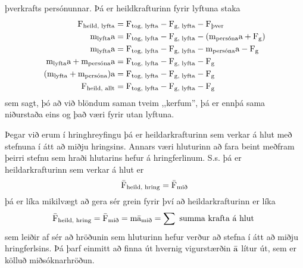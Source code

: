 þverkrafts persónunnar. Þá er heildkrafturinn fyrir lyftuna staka
\begin{align*}
	\textrm{F}_\text{heild, lyfta}
		&= \textrm{F}_\text{tog, lyfta} - \textrm{F}_\text{g, lyfta} - \textrm{F}_\text{þver} \\
	\textrm{m}_\text{lyfta} \textrm{a}
		&= \textrm{F}_\text{tog, lyfta} - \textrm{F}_\text{g, lyfta} - (\textrm{m}_\text{persóna} \textrm{a} + \textrm{F}_\text{g} ) \\
	\textrm{m}_\text{lyfta} \textrm{a}
		&= \textrm{F}_\text{tog, lyfta} - \textrm{F}_\text{g, lyfta} - \textrm{m}_\text{persóna} \textrm{a} - \textrm{F}_\text{g} \\
	\textrm{m}_\text{lyfta} \textrm{a} + \textrm{m}_\text{persóna} \textrm{a}
		&= \textrm{F}_\text{tog, lyfta} - \textrm{F}_\text{g, lyfta}  - \textrm{F}_\text{g} \\
	(\textrm{m}_\text{lyfta} + \textrm{m}_\text{persóna}) \textrm{a}
		&= \textrm{F}_\text{tog, lyfta} - \textrm{F}_\text{g, lyfta}  - \textrm{F}_\text{g} \\
	\textrm{F}_\text{heild, allt}
		&= \textrm{F}_\text{tog, lyfta} - \textrm{F}_\text{g, lyfta}  - \textrm{F}_\text{g} \\
\end{align*}
sem sagt, þó að við blöndum saman tveim ,,kerfum'', þá er ennþá sama niðurstaða
eins og það væri fyrir utan lyftuna. 

Þegar við erum í hringhreyfingu þá er heildarkrafturinn sem verkar á hlut með
stefnuna í átt að miðju hringsins. Annars væri hluturinn að fara beint meðfram
þeirri stefnu sem hraði hlutarins hefur á hringferlinum. S.s. þá er heildarkrafturinn
sem verkar á hlut er
\begin{equation}
	\bar{\textrm{F}}_\text{heild, hring} = \bar{\textrm{F}}_\text{mið}
\end{equation}
þá er líka mikilvægt að gera sér grein fyrir því að heildarkrafturinn
er líka
\[
	\bar{\textrm{F}}_\text{heild, hring} 
		= \bar{\textrm{F}}_\text{mið}
		= \textrm{m} \bar{\textrm{a}}_\text{mið}
		= \sum \text{ summa krafta á hlut }
\]
sem leiðir af sér að hröðunin sem hluturinn hefur verður að stefna í átt að
miðju hringferlsins. Þá þarf einmitt að finna út hvernig vigurstærðin 
$\bar {\textrm{a}}$ lítur út, sem er kölluð miðsóknarhröðun.


